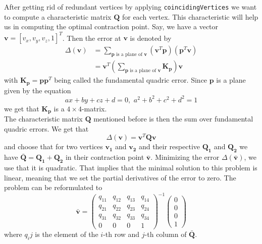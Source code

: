 After getting rid of redundant vertices by applying \texttt{coincidingVertices} we want to compute a characteristic matrix \(\bm{Q}\) for each vertex. This characteristic will help us in computing the optimal contraction point. Say, we have a vector \(\bm{v}=[v_x, v_y, v_z, 1]^T\). Then the error at \(\bm{v}\) is denoted by
\begin{align*}
    \Delta(\bm{v})&=\sum_{\bm{p}\text{ is a plane of }\bm{v}}(\bm{v}^T\bm{p})(\bm{p}^T\bm{v})\\
    &=\bm{v}^T\left(\sum_{\bm{p}\text{ is a plane of }\bm{v}}\bm{K}_{\bm{p}}\right)\bm{v}
\end{align*}
with \(\bm{K}_{\bm{p}}=\bm{p}\bm{p}^T\) being called the fundamental quadric error. Since \(\bm{p}\) is a plane given by the equation
\begin{equation*}
    ax+by+cz+d=0,\hspace{4pt}a^2+b^2+c^2+d^2=1
\end{equation*}
we get that \(\bm{K}_{\bm{p}}\) is a \(4\times4\)-matrix.\\
The characteristic matrix \(\bm{Q}\) mentioned before is then the sum over fundamental quadric errors. We get that
\begin{equation}\label{eq:contraction_cost}
    \Delta(\bm{v})=\bm{v}^T\bm{Q}\bm{v}
\end{equation}
and choose that for two vertices $\bm{v_1}$ and $\bm{v_2}$ and their respective $\bm{Q_1}$ and $\bm{Q_2}$ we have $\bar{\bm{Q}}=\bm{Q_1}+\bm{Q_2}$ in their contraction point $\bar{\bm{v}}$. Minimizing the error $\Delta(\bar{\bm{v}})$, we use that it is quadratic. That implies that the minimal solution to this problem is linear, meaning that we set the partial derivatives of the error to zero. The problem can be reformulated to
\begin{equation*}
    \bar{\bm{v}}=\begin{pmatrix}
        q_{11} &q_{12} &q_{13} &q_{14}\\
        q_{21} &q_{22} &q_{23} &q_{24}\\
        q_{31} &q_{32} &q_{33} &q_{34}\\
        0   &0  &0  &1
    \end{pmatrix}^{-1}\begin{pmatrix}
        0\\0\\0\\1
    \end{pmatrix}
\end{equation*}
where $q_ij$ is the element of the $i$-th row and $j$-th column of $\bar{\bm{Q}}$.


